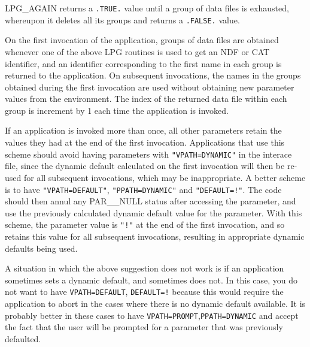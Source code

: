 \documentclass[twoside,11pt]{starlink}
\begin{document}
{{      LPG\_AGAIN returns a \texttt{.TRUE.} value until a group of data files is
      exhausted, whereupon it deletes all its groups and returns a
      \texttt{.FALSE.} value.

      On the first invocation of the application, groups of data files are
      obtained whenever one of the above LPG routines is used to get an NDF
      or CAT identifier, and an identifier corresponding to the first name in
      each group is returned to the application. On subsequent invocations,
      the names in the groups obtained during the first invocation are used
      without obtaining new parameter values from the environment. The
      index of the returned data file within each group is increment by 1
      each time the application is invoked.

      If an application is invoked more than once, all other
      parameters retain the values they had at the end of the first
      invocation. Applications that use this scheme should avoid
      having parameters with \texttt{"VPATH=DYNAMIC"} in the interace
      file, since the dynamic default calculated on the first
      invocation will then be re-used for all subsequent invocations,
      which may be inappropriate. A better scheme is to have
      \texttt{"VPATH=DEFAULT"}, \texttt{"PPATH=DYNAMIC"} and \texttt{"DEFAULT=!"}.
      The code should then annul any PAR\_\_NULL status after
      accessing the parameter, and use the previously calculated
      dynamic default value for the parameter. With this scheme, the
      parameter value is \texttt{"!"} at the end of the first invocation,
      and so retains this value for all subsequent invocations,
      resulting in appropriate dynamic defaults being used.

      A situation in which the above suggestion does not work is if an
      application sometimes sets a dynamic default, and sometimes
      does not. In this case, you do not want to have
      \texttt{VPATH=DEFAULT}, \texttt{DEFAULT=!} because this would require the
      application to abort in the cases where there is no dynamic default
      available. It is probably better in these cases to have
      \texttt{VPATH=PROMPT},\texttt{PPATH=DYNAMIC} and accept the fact that the user
      will be prompted for a parameter that was previously defaulted.

}}
\end{document}
